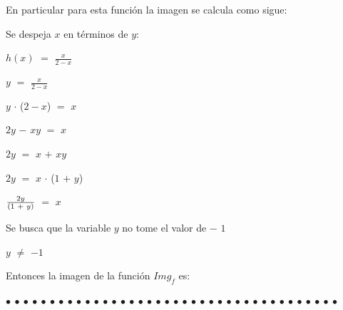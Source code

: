 \documentclass[12pt]{article}
\newenvironment{MyColorPar}[1]{%
    \leavevmode\color{#1}\ignorespaces%
}{%
}%
\begin{document}
\begin{MyColorPar}{darkmagenta} \bfseries{
{} 
En particular para esta función la imagen se calcula como sigue: \vspace{0.5cm}

Se despeja $x$ en términos de $y$: \vspace{0.5cm}

\hspace{4cm}  $h(x)$ $=$ {\LARGE{$\frac{x}{2-x}$}} \vspace{0.5cm}

\hspace{4.6cm}  $y$ $=$ {\LARGE{$\frac{x}{2-x}$}} \vspace{0.5cm}

\hspace{4.6cm}  $y$ $\cdot$ ($2-x$) $=$ $x$ \vspace{0.5cm}

\hspace{4.6cm}  $2y$ $-$ $xy$ $=$ $x$ \vspace{0.5cm}

\hspace{4.6cm}  $2y$ $=$ $x$  $+$ $xy$ \vspace{0.5cm}

\hspace{4.6cm}  $2y$ $=$ $x$ $\cdot$ ($1$ $+$ $y$) \vspace{0.5cm}

\hspace{4.6cm} {\LARGE{$\frac{2y}{(1 \hspace{0.1cm} + \hspace{0.1cm} y)}$}} $=$ $x$  \vspace{0.5cm}

Se busca que la variable $y$ no tome el valor de $-$ $1$\vspace{0.5cm}

\hspace{5cm} $y$ $\neq$ $-1$  \vspace{0.5cm}

Entonces la imagen de la función $Img_{f}$ es: \vspace{0.5cm}

\hspace{3cm} } \vspace{0.5cm}

\end{MyColorPar}

\begin{MyColorPar}{Saffron} \bfseries{
 $\bullet$ $\bullet$ $\bullet$ $\bullet$ $\bullet$ $\bullet$ $\bullet$ $\bullet$ $\bullet$ $\bullet$ $\bullet$ $\bullet$ $\bullet$ $\bullet$ $\bullet$ $\bullet$ $\bullet$ $\bullet$ $\bullet$ $\bullet$ $\bullet$ $\bullet$ $\bullet$ $\bullet$ $\bullet$ $\bullet$ $\bullet$ $\bullet$ $\bullet$ $\bullet$ $\bullet$ $\bullet$ $\bullet$ $\bullet$ $\bullet$ $\bullet$ $\bullet$ $\bullet$  }
\end{MyColorPar} \vspace{0.5cm}
\end{document}
